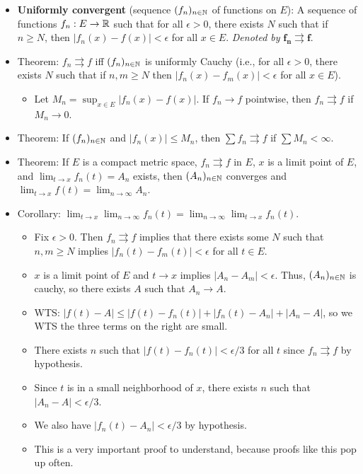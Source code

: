 \documentclass[../../notes.tex]{subfiles}
\begin{document}
\begin{itemize}
    \item \textbf{Uniformly convergent} (sequence $(f_n)_{n\in\mathbb{N}}$ of functions on $E$): A sequence of functions $f_n:E\to\mathbb{R}$ such that for all $\epsilon>0$, there exists $N$ such that if $n\geq N$, then $|f_n(x)-f(x)|<\epsilon$ for all $x\in E$. \emph{Denoted by} $\bm{f_n\rightrightarrows f}$.
    \item Theorem: $f_n\rightrightarrows f$ iff $(f_n)_{n\in\mathbb{N}}$ is uniformly Cauchy (i.e., for all $\epsilon>0$, there exists $N$ such that if $n,m\geq N$ then $|f_n(x)-f_m(x)|<\epsilon$ for all $x\in E$).
    \begin{itemize}
        \item Let $M_n=\sup_{x\in E}|f_n(x)-f(x)|$. If $f_n\to f$ pointwise, then $f_n\rightrightarrows f$ if $M_n\to 0$.
    \end{itemize}
    \item Theorem: If $(f_n)_{n\in\mathbb{N}}$ and $|f_n(x)|\leq M_n$, then $\sum f_n\rightrightarrows f$ if $\sum M_n<\infty$.
    \item Theorem: If $E$ is a compact metric space, $f_n\rightrightarrows f$ in $E$, $x$ is a limit point of $E$, and $\lim_{t\to x}f_n(t)=A_n$ exists, then $(A_n)_{n\in\mathbb{N}}$ converges and $\lim_{t\to x}f(t)=\lim_{n\to\infty}A_n$.
    \item Corollary: $\lim_{t\to x}\lim_{n\to\infty}f_n(t)=\lim_{n\to\infty}\lim_{t\to x}f_n(t)$.
    \begin{itemize}
        \item {}Fix $\epsilon>0$. Then $f_n\rightrightarrows f$ implies that there exists some $N$ such that $n,m\geq N$ implies $|f_n(t)-f_m(t)|<\epsilon$ for all $t\in E$.
        \item $x$ is a limit point of $E$ and $t\to x$ implies $|A_n-A_m|<\epsilon$. Thus, $(A_n)_{n\in\mathbb{N}}$ is cauchy, so there exists $A$ such that $A_n\to A$.
        \item WTS: $|f(t)-A|\leq|f(t)-f_n(t)|+|f_n(t)-A_n|+|A_n-A|$, so we WTS the three terms on the right are small.
        \item There exists $n$ such that $|f(t)-f_n(t)|<\epsilon/3$ for all $t$ since $f_n\rightrightarrows f$ by hypothesis.
        \item Since $t$ is in a small neighborhood of $x$, there exists $n$ such that $|A_n-A|<\epsilon/3$.
        \item We also have $|f_n(t)-A_n|<\epsilon/3$ by hypothesis.
        \item This is a very important proof to understand, because proofs like this pop up often.

\end{itemize}
\end{itemize}
\end{document}
